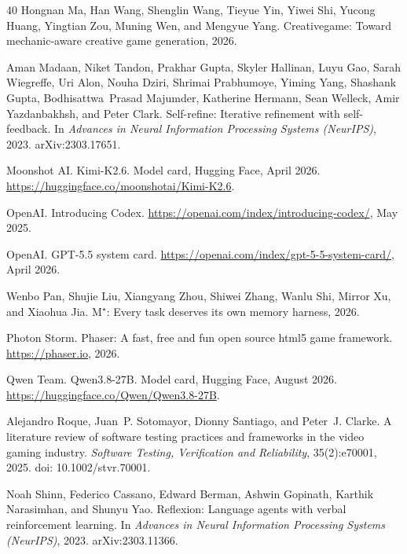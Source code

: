 \begin{thebibliography}{40}
Hongnan Ma, Han Wang, Shenglin Wang, Tieyue Yin, Yiwei Shi, Yucong Huang, Yingtian Zou, Muning Wen, and Mengyue Yang.
\newblock Creativegame: Toward mechanic-aware creative game generation, 2026.

Aman Madaan, Niket Tandon, Prakhar Gupta, Skyler Hallinan, Luyu Gao, Sarah Wiegreffe, Uri Alon, Nouha Dziri, Shrimai Prabhumoye, Yiming Yang, Shashank Gupta, Bodhisattwa~Prasad Majumder, Katherine Hermann, Sean Welleck, Amir Yazdanbakhsh, and Peter Clark.
\newblock Self-refine: Iterative refinement with self-feedback.
\newblock In \emph{Advances in Neural Information Processing Systems (NeurIPS)}, 2023. arXiv:2303.17651.

Moonshot AI.
\newblock Kimi-K2.6.
\newblock Model card, Hugging Face, April 2026. \url{https://huggingface.co/moonshotai/Kimi-K2.6}.

OpenAI.
\newblock Introducing Codex.
\newblock \url{https://openai.com/index/introducing-codex/}, May 2025.

OpenAI.
\newblock GPT-5.5 system card.
\newblock \url{https://openai.com/index/gpt-5-5-system-card/}, April 2026.

Wenbo Pan, Shujie Liu, Xiangyang Zhou, Shiwei Zhang, Wanlu Shi, Mirror Xu, and Xiaohua Jia.
\newblock M$^\star$: Every task deserves its own memory harness, 2026.

Photon Storm.
\newblock Phaser: A fast, free and fun open source html5 game framework.
\newblock \url{https://phaser.io}, 2026.

Qwen Team.
\newblock Qwen3.8-27B.
\newblock Model card, Hugging Face, August 2026. \url{https://huggingface.co/Qwen/Qwen3.8-27B}.

Alejandro Roque, Juan~P. Sotomayor, Dionny Santiago, and Peter~J. Clarke.
\newblock A literature review of software testing practices and frameworks in the video gaming industry.
\newblock \emph{Software Testing, Verification and Reliability}, 35(2):e70001, 2025. doi: 10.1002/stvr.70001.

Noah Shinn, Federico Cassano, Edward Berman, Ashwin Gopinath, Karthik Narasimhan, and Shunyu Yao.
\newblock Reflexion: Language agents with verbal reinforcement learning.
\newblock In \emph{Advances in Neural Information Processing Systems (NeurIPS)}, 2023. arXiv:2303.11366.


\end{thebibliography}

